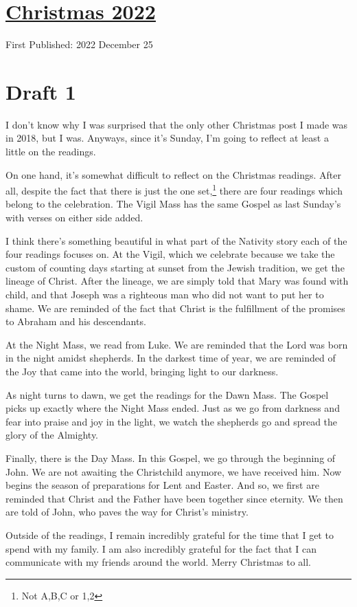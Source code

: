 \documentclass[12pt]{article}[titlepage]
\newcommand{\1}{\={a}}
\newcommand{\2}{\={e}}
\newcommand{\3}{\={\i}}
\newcommand{\4}{\=o}
\newcommand{\5}{\=u}
\newcommand{\6}{\={A}}
\renewcommand{\,}{\textsuperscript{,}}
\begin{document}
\doublespacing
\section{\href{christmas-2022.html}{Christmas 2022}}
First Published: 2022 December 25
\section{Draft 1}
I don't know why I was surprised that the only other Christmas post I made was in 2018, but I was.
Anyways, since it's Sunday, I'm going to reflect at least a little on the readings.

On one hand, it's somewhat difficult to reflect on the Christmas readings.
After all, despite the fact that there is just the one set,\footnote{Not A,B,C or 1,2} there are four readings which belong to the celebration.
The Vigil Mass has the same Gospel as last Sunday's with verses on either side added.

I think there's something beautiful in what part of the Nativity story each of the four readings focuses on.
At the Vigil, which we celebrate because we take the custom of counting days starting at sunset from the Jewish tradition, we get the lineage of Christ.
After the lineage, we are simply told that Mary was found with child, and that Joseph was a righteous man who did not want to put her to shame.
We are reminded of the fact that Christ is the fulfillment of the promises to Abraham and his descendants.

At the Night Mass, we read from Luke.
We are reminded that the Lord was born in the night amidst shepherds.
In the darkest time of year, we are reminded of the Joy that came into the world, bringing light to our darkness.

As night turns to dawn, we get the readings for the Dawn Mass.
The Gospel picks up exactly where the Night Mass ended.
Just as we go from darkness and fear into praise and joy in the light, we watch the shepherds go and spread the glory of the Almighty.

Finally, there is the Day Mass.
In this Gospel, we go through the beginning of John.
We are not awaiting the Christchild anymore, we have received him.
Now begins the season of preparations for Lent and Easter.
And so, we first are reminded that Christ and the Father have been together since eternity.
We then are told of John, who paves the way for Christ's ministry.

Outside of the readings, I remain incredibly grateful for the time that I get to spend with my family.
I am also incredibly grateful for the fact that I can communicate with my friends around the world.
Merry Christmas to all.
\end{document}
